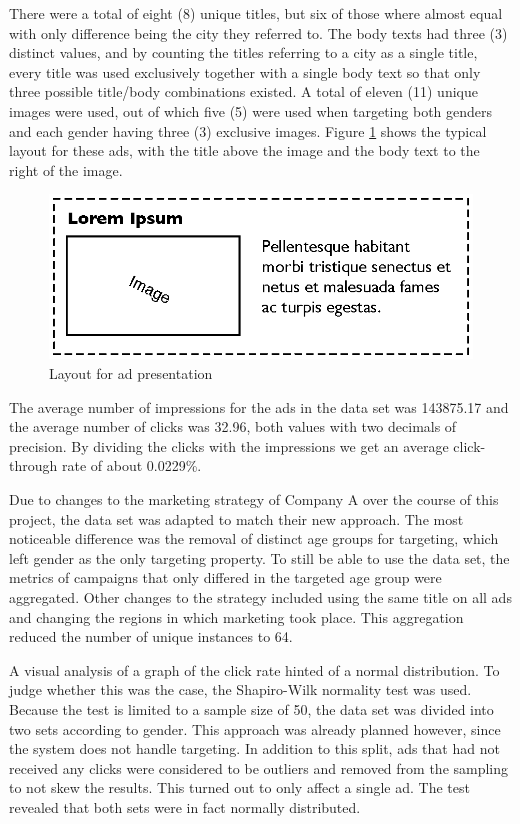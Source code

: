 \documentclass{sig-alternate}
\begin{document}
There were a total of eight (8) unique titles, but six of those where almost equal with only difference being the city they referred to. The body texts had three (3) distinct values, and by counting the titles referring to a city as a single title, every title was used exclusively together with a single body text so that only three possible title/body combinations existed. A total of eleven (11) unique images were used, out of which five (5) were used when targeting both genders and each gender having three (3) exclusive images. Figure \ref{fig:AdLayout} shows the typical layout for these ads, with the title above the image and the body text to the right of the image.

\begin{figure}[htpb]
	\centering
	\includegraphics[width=\columnwidth]{ad-layout.eps}
	\caption{Layout for ad presentation}
	\label{fig:AdLayout}
\end{figure}

The average number of impressions for the ads in the data set was 143875.17 and the average number of clicks was 32.96, both values with two decimals of precision. By dividing the clicks with the impressions we get an average click-through rate of about 0.0229\%.

Due to changes to the marketing strategy of Company A over the course of this project, the data set was adapted to match their new approach. The most noticeable difference was the removal of distinct age groups for targeting, which left gender as the only targeting property. To still be able to use the data set, the metrics of campaigns that only differed in the targeted age group were aggregated. Other changes to the strategy included using the same title on all ads and changing the regions in which marketing took place. This aggregation reduced the number of unique instances to 64.

A visual analysis of a graph of the click rate hinted of a normal distribution. To judge whether this was the case, the Shapiro-Wilk normality test \citep{Shapiro1965} was used. Because the test is limited to a sample size of 50, the data set was divided into two sets according to gender. This approach was already planned however, since the system does not handle targeting. In addition to this split, ads that had not received any clicks were considered to be outliers and removed from the sampling to not skew the results. This turned out to only affect a single ad. The test revealed that both sets were in fact normally distributed.
\end{document}
